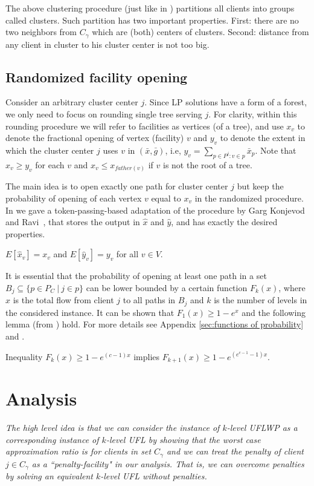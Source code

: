 \documentclass{llncs}
\newcommand{\va}[1]{{\color{black}\sl  #1}}
\begin{document}
The above clustering procedure (just like in \cite{Chudak}) partitions all clients into groups called clusters. Such partition has two important properties.
First: there are no two neighbors from $C_{\gamma}$ which are (both) centers of clusters.
Second: distance from any client in cluster to his cluster center is not too big.

\subsection{Randomized facility opening}

Consider an arbitrary cluster center $j$. Since LP solutions have a form of a forest, we only need to focus on rounding single tree serving $j$. For clarity, within this rounding procedure we will refer to facilities as vertices (of a tree), and use $x_v$ to denote the fractional opening of vertex (facility) $v$ and $y_v$ to denote the extent in which the cluster center $j$ uses $v$ in $(\bar{x}, \bar{g})$, i.e, $y_v = \sum_{p \in P^{j} : v \in p} \bar{x}_p$. Note that $x_v\geq y_v$ for each $v$ and $x_v\leq x_{father(v)}$ if $v$ is not the root of a tree.

The main idea is to open exactly one path for cluster center $j$ but keep the probability of opening of each vertex $v$ equal to $x_v$ in the randomized procedure.
In \cite{Rybicki} we gave a token-passing-based adaptation of the procedure by Garg Konjevod and Ravi~\cite{Garg}, that stores the output in $\hat{x}$ and $\hat{y}$,
and has exactly the desired properties.

\begin{lemma}
 $E[\hat{x}_v] = x_v$ and $E[\hat{y}_v] = y_v$ for all $v \in V$.
\end{lemma}

It is essential that the probability of opening at least one path in a set $B_j \subseteq \{p \in P_C~|~j \in p\}$ can be lower bounded by a certain function $F_k(x)$, where $x$ is the total flow from client $j$ to all paths in $B_j$ and $k$ is the number of levels in the considered instance. It can be shown that $F_1(x) \geq 1 - e^x$ and the following lemma (from \cite{Rybicki}) hold.
For more details see Appendix \ref{sec:functions of probability} and \cite{Rybicki}.

\begin{lemma}
 Inequality $F_{k}(x) \geq 1 - e^{(c-1)x}$ implies $F_{k+1}(x) \geq 1 - e^{(e^{c-1} - 1)x}$.
\end{lemma}

\section{Analysis}
\va{The high level idea is that we can consider the instance of $k$-level UFLWP as a corresponding instance of $k$-level UFL 
by showing that the worst case approximation ratio is for clients in set $C_{\gamma}$ and we can treat the penalty of client $j\in C_{\gamma}$ 
as a ``penalty-facility" in our analysis. That is, we can overcome penalties by solving an equivalent $k$-level UFL without penalties.}
\end{document}
